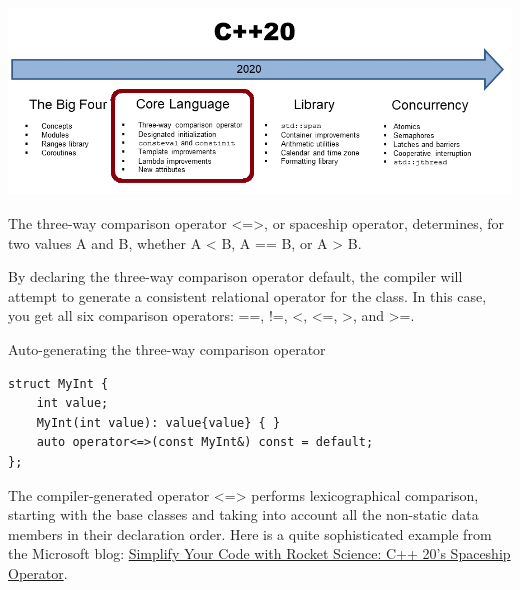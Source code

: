 

\begin{center}
\includegraphics[width=1.0\textwidth]{content/2/chapter3/images/4.png}\\
\end{center}


The three-way comparison operator <=>, or spaceship operator, determines, for two values A and B, whether A < B, A == B, or A > B.

By declaring the three-way comparison operator default, the compiler will attempt to generate a consistent relational operator for the class. In this case, you get all six comparison operators: ==, !=, <, <=, >, and >=.

\noindent
Auto-generating the three-way comparison operator
\begin{lstlisting}[style=styleCXX]
struct MyInt {
	int value;
	MyInt(int value): value{value} { }
	auto operator<=>(const MyInt&) const = default;
};
\end{lstlisting}

The compiler-generated operator <=> performs lexicographical comparison, starting with the base classes and taking into account all the non-static data members in their declaration order. Here is a quite sophisticated example from the Microsoft blog: \href{https://devblogs.microsoft.com/cppblog/simplify-your-code-with-rocket-science-c20s-spaceship-operator/}{Simplify Your Code with Rocket Science: C++ 20’s Spaceship Operator}.


